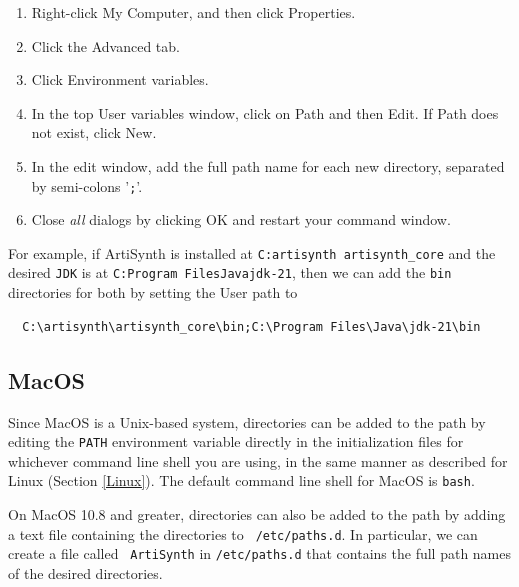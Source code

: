 \documentclass{article}
\begin{document}
\begin{enumerate}

\item Right-click {\sf My Computer}, and then click {\sf Properties}.

\item Click the {\sf Advanced} tab.

\item Click {\sf Environment variables}.

\item In the top {\sf User variables} window, click on {\sf Path} and 
then {\sf Edit}. If {\sf Path} does not exist, click {\sf New}.

\item In the edit window, add the full path name for each new directory,
separated by semi-colons '{\tt ;}'.

\item Close {\it all} dialogs by clicking {\sf OK} and restart 
your command window.

\end{enumerate}

For example, if ArtiSynth is installed at {\tt C:\BKS artisynth\BKS
artisynth\_core} and the desired {\tt JDK} is at {\tt C:\BKS Program
Files\BKS Java\BKS jdk-21}, then we can add the {\tt bin}
directories for both by setting the User path to
\begin{verbatim}
  C:\artisynth\artisynth_core\bin;C:\Program Files\Java\jdk-21\bin
\end{verbatim}

\subsection{MacOS}

Since MacOS is a Unix-based system, directories can be added to the
path by editing the {\tt PATH} environment variable directly in the
initialization files for whichever command line shell you are using,
in the same manner as described for Linux (Section \ref{Linux}).
The default command line shell for MacOS is {\tt bash}.

On MacOS 10.8 and greater, directories can also be added to the
path by adding a text file containing the directories to {\tt
/etc/paths.d}.  In particular, we can create a file called {\tt
ArtiSynth} in {\tt /etc/paths.d} that contains the full path names of
the desired directories.
\end{document}
